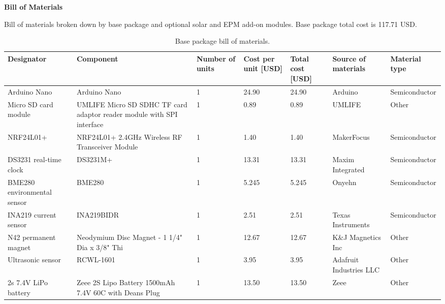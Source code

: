 \documentclass[11pt,letterpaper]{article}
\begin{document}
	
	\begin{center}
		{\Large\textbf{Bill of Materials}}
	\end{center}

\noindent Bill of materials broken down by base package and optional solar and EPM add-on modules. Base package total cost is 117.71 USD.

\setlength{\abovedisplayskip}{3pt}
\setlength{\belowdisplayskip}{3pt}

\begin{longtable}{ p{1.75cm} p{4cm} p{1.25cm} p{1cm} p{1cm} p{2cm} p{2.5cm} }	
	\caption{Base package bill of materials.} 
	\label{components} \\
	\toprule
	Designator & Component & Number of units & Cost per unit [USD] & Total cost [USD] & Source of materials & Material type \\
	\midrule
	Arduino Nano & Arduino Nano & 1 & 24.90 & 24.90 & Arduino & Semiconductor \\
	
	\rowcolor[gray]{0.925}
	Micro SD card module & UMLIFE Micro SD SDHC TF card adaptor reader module with SPI interface & 1 & 0.89 & 0.89 & UMLIFE & Other \\
	
	NRF24L01+ & NRF24L01+ 2.4GHz Wireless RF Transceiver Module & 1 & 1.40 & 1.40 & MakerFocus & Semiconductor \\ 
	
	\rowcolor[gray]{0.925}
	DS3231 real-time clock & DS3231M+ & 1 & 13.31 & 13.31 & Maxim Integrated & Semiconductor \\ 
	
	BME280 environmental sensor & BME280 & 1 & 5.245 & 5.245 & Onyehn & Semiconductor \\ 
	
	\rowcolor[gray]{0.925}
	INA219 current sensor & INA219BIDR & 1 & 2.51 & 2.51 & Texas Instruments & Semiconductor \\ 
	
	N42 permanent magnet & Neodymium Disc Magnet - 1 1/4" Dia x 3/8" Thi & 1 & 12.67 & 12.67 & K\&J Magnetics Inc & Other \\ 
	
	\rowcolor[gray]{0.925}
	Ultrasonic sensor & RCWL-1601 & 1 & 3.95 & 3.95 & Adafruit Industries LLC & Other \\
	
	2s 7.4V LiPo battery & Zeee 2S Lipo Battery 1500mAh 7.4V 60C with Deans Plug & 1 & 13.50 & 13.50 & Zeee & Other \\
	

\end{longtable}
\end{document}
